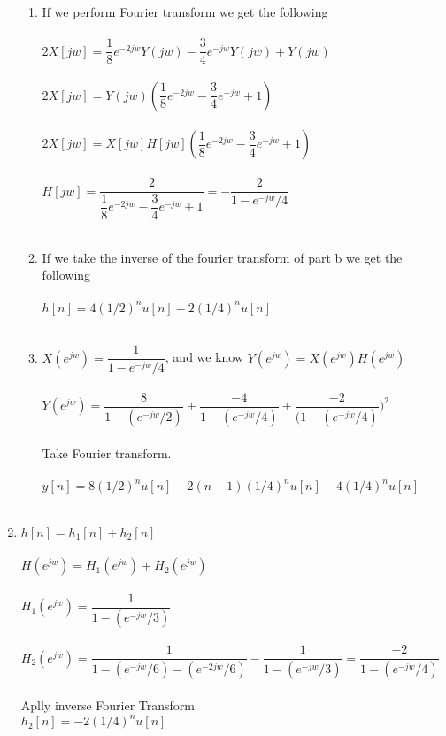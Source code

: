 \documentclass[10pt,a4paper, margin=1in]{article}
\begin{document}
\begin{enumerate}
\begin{enumerate}
    \item %
    If we perform Fourier transform we get the following \\ \\
    $2X[jw] = \dfrac{1}{8} e^{-2jw} Y(jw) - \dfrac{3}{4}e^{-jw} Y(jw) + Y(jw)$ \\ \\
    $2X[jw] = Y(jw)(\dfrac{1}{8} e^{-2jw} - \dfrac{3}{4}e^{-jw} + 1)$ \\ \\
    $2X[jw] = X[jw]H[jw](\dfrac{1}{8} e^{-2jw} - \dfrac{3}{4}e^{-jw} + 1)$ \\ \\
    $H[jw] = \dfrac{2}{\dfrac{1}{8} e^{-2jw} - \dfrac{3}{4}e^{-jw} + 1} = - \dfrac{2}{1- e^{-jw}/4}$ \\ \\

    \item %

    If we take the inverse of the fourier transform of part b we get the following \\ \\
    $h[n] = 4 (1/2)^n u[n] - 2 (1/4)^n u[n]$ \\ \\

    \item %
    $X(e^{jw}) = \dfrac{1}{1- e^{-jw}/4}$, and we know $Y(e^{jw}) = X(e^{jw}) H(e^{jw})$ \\ \\
    $Y(e^{jw}) = \dfrac{8}{1- (e^{-jw}/2)} + \dfrac{-4}{1- (e^{-jw}/4)} + \dfrac{-2}{(1- (e^{-jw}/4)})^2 $ \\ \\
    Take Fourier transform. \\ \\
    $y[n] = 8 (1/2)^n u[n] - 2(n+1) (1/4)^n u[n] - 4(1/4)^n u[n]$ \\ \\
    \end{enumerate}

\item %
    $h[n] = h_1[n] + h_2[n]$ \\ \\
    $H(e^{jw}) = H_1(e^{jw}) + H_2(e^{jw})$ \\ \\
    $H_1(e^{jw}) = \dfrac{1}{ 1- (e^{-jw}/3)}$ \\ \\
    $H_2(e^{jw}) = \dfrac{1}{1- (e^{-jw}/6) - (e^{-2jw}/6) } - \dfrac{1}{ 1- (e^{-jw}/3)} = \dfrac{-2}{1- (e^{-jw}/4)}$ \\ \\
    Aplly inverse Fourier Transform \\
    $h_2[n] = -2(1/4)^n u[n]$ \\ \\



\end{enumerate}
\end{document}
